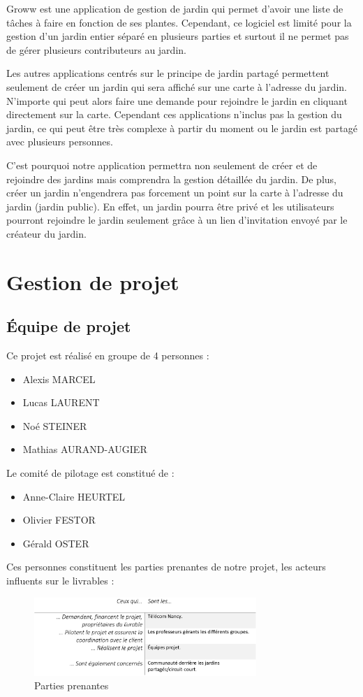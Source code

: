 \documentclass[french,a4paper]{article}
\begin{document}
Groww est une application de gestion de jardin qui permet d’avoir une liste de tâches à faire en fonction de ses plantes. Cependant, ce logiciel est limité pour la gestion d’un jardin entier séparé en plusieurs parties et surtout il ne permet pas de gérer plusieurs contributeurs au jardin.

Les autres applications centrés sur le principe de jardin partagé permettent seulement de créer un jardin qui sera affiché sur une carte à l’adresse du jardin. N’importe qui peut alors faire une demande pour rejoindre le jardin en cliquant directement sur la carte. Cependant ces applications n’inclus pas la gestion du jardin, ce qui peut être très complexe à partir du moment ou le jardin est partagé avec plusieurs personnes.

C’est pourquoi notre application permettra non seulement de créer et de rejoindre des jardins mais comprendra la gestion détaillée du jardin. De plus, créer un jardin n’engendrera pas forcement un point sur la carte à l’adresse du jardin (jardin public). En effet, un jardin pourra être privé et les utilisateurs pourront rejoindre le jardin seulement grâce à un lien d’invitation envoyé par le créateur du jardin.


\newpage
\section{Gestion de projet}
\subsection{Équipe de projet}
Ce projet est réalisé en groupe de 4 personnes :
\begin{itemize}
    \item Alexis MARCEL
    \item Lucas LAURENT
    \item Noé STEINER
    \item Mathias AURAND-AUGIER
\end{itemize}
Le comité de pilotage est constitué de :
\begin{itemize}
    \item Anne-Claire HEURTEL
    \item Olivier FESTOR
    \item Gérald OSTER
\end{itemize}
Ces personnes constituent les parties prenantes de notre projet, les acteurs influents sur le livrables :
\begin{figure}[H]
    \centering
    \includegraphics[width=0.75\textwidth]{img/parties_prenantes.png}
    \caption{Parties prenantes}
\end{figure} 
\end{document}

